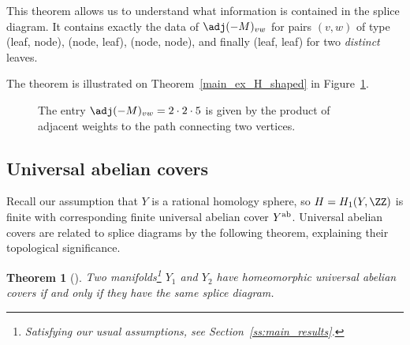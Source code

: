 \documentclass[10pt,a4paper]{amsart}
\newtheorem{Theorem}{Theorem}[section]
\begin{document}
This theorem allows us to understand what information is contained in the splice diagram. It contains exactly the data of $\adj(-M)_{vw}$ for pairs $(v, w)$ of type (leaf, node), (node, leaf), (node, node), and finally (leaf, leaf) for two \emph{distinct} leaves.

The theorem is illustrated on Theorem~\ref{main_ex_H_shaped} in Figure~\ref{fig:path}.
	\begin{figure}[ht]
		\centering
		\caption{The entry $\adj(-M)_{vw} = 2 \cdot 2 \cdot 5$ is given by the product of adjacent weights to the path connecting two vertices.}
		\label{fig:path}
	\end{figure}

\subsection{Universal abelian covers}

Recall our assumption that $Y$ is a rational homology sphere, so $H = H_1(Y, \ZZ)$ is finite with corresponding finite universal abelian cover $Y^{\rm ab}$. Universal abelian covers are related to splice diagrams by the following theorem, explaining their topological significance.

\begin{Theorem}[\cite{NW05a, Pe09}]\label{thm:ab_cover}
	Two manifolds\footnote{Satisfying our usual assumptions, see Section~\ref{ss:main_results}.} $Y_1$ and $Y_2$ have homeomorphic universal abelian covers if and only if they have the same splice diagram.
\end{Theorem}
\end{document}
